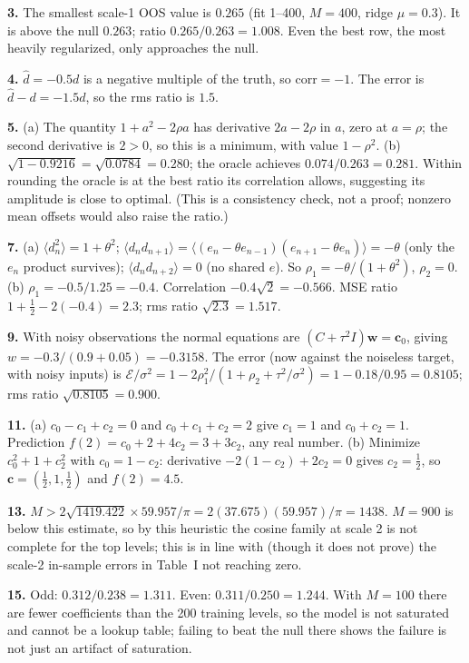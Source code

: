 \textbf{3.} The smallest scale-1 OOS value is $0.265$ (fit 1--400, $M=400$, ridge $\mu=0.3$). It is above the null $0.263$; ratio $0.265/0.263=1.008$. Even the best row, the most heavily regularized, only approaches the null.

\textbf{4.} $\hat d=-0.5d$ is a negative multiple of the truth, so $\mathrm{corr}=-1$. The error is $\hat d-d=-1.5d$, so the rms ratio is $1.5$.

\textbf{5.} (a) The quantity $1+a^2-2\rho a$ has derivative $2a-2\rho$ in $a$, zero at $a=\rho$; the second derivative is $2>0$, so this is a minimum, with value $1-\rho^2$. (b) $\sqrt{1-0.9216}=\sqrt{0.0784}=0.280$; the oracle achieves $0.074/0.263=0.281$. Within rounding the oracle is at the best ratio its correlation allows, suggesting its amplitude is close to optimal. (This is a consistency check, not a proof; nonzero mean offsets would also raise the ratio.)

\textbf{7.} (a) $\langle d_n^2\rangle=1+\theta^2$; $\langle d_nd_{n+1}\rangle=\langle(e_n-\theta e_{n-1})(e_{n+1}-\theta e_n)\rangle=-\theta$ (only the $e_n$ product survives); $\langle d_nd_{n+2}\rangle=0$ (no shared $e$). So $\rho_1=-\theta/(1+\theta^2)$, $\rho_2=0$. (b) $\rho_1=-0.5/1.25=-0.4$. Correlation $-0.4\sqrt2=-0.566$. MSE ratio $1+\tfrac12-2(-0.4)=2.3$; rms ratio $\sqrt{2.3}=1.517$.

\textbf{9.} With noisy observations the normal equations are $(C+\tau^2I)\bm w=\bm c_0$, giving $w=-0.3/(0.9+0.05)=-0.3158$. The error (now against the noiseless target, with noisy inputs) is $\mathcal E/\sigma^2=1-2\rho_1^2/(1+\rho_2+\tau^2/\sigma^2)=1-0.18/0.95=0.8105$; rms ratio $\sqrt{0.8105}=0.900$.

\textbf{11.} (a) $c_0-c_1+c_2=0$ and $c_0+c_1+c_2=2$ give $c_1=1$ and $c_0+c_2=1$. Prediction $f(2)=c_0+2+4c_2=3+3c_2$, any real number. (b) Minimize $c_0^2+1+c_2^2$ with $c_0=1-c_2$: derivative $-2(1-c_2)+2c_2=0$ gives $c_2=\tfrac12$, so $\bm c=(\tfrac12,1,\tfrac12)$ and $f(2)=4.5$.

\textbf{13.} $M>2\sqrt{1419.422}\times59.957/\pi=2(37.675)(59.957)/\pi=1438$. $M=900$ is below this estimate, so by this heuristic the cosine family at scale 2 is not complete for the top levels; this is in line with (though it does not prove) the scale-2 in-sample errors in Table~I not reaching zero.

\textbf{15.} Odd: $0.312/0.238=1.311$. Even: $0.311/0.250=1.244$. With $M=100$ there are fewer coefficients than the 200 training levels, so the model is not saturated and cannot be a lookup table; failing to beat the null there shows the failure is not just an artifact of saturation.

